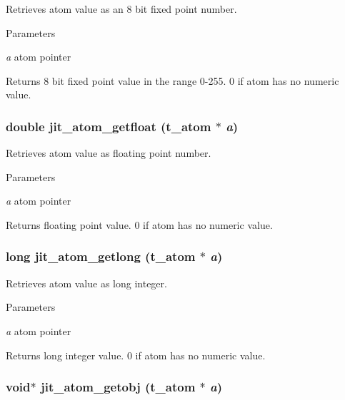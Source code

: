 Retrieves atom value as an 8 bit fixed point number. 
\begin{DoxyParams}{Parameters}
\item[{\em a}]atom pointer\end{DoxyParams}
\begin{DoxyReturn}{Returns}
8 bit fixed point value in the range 0-\/255. 0 if atom has no numeric value. 
\end{DoxyReturn}
\hypertarget{group__atommod_gae5882d0bf97c939882126ba235eee409}{
\subsubsection[{jit\_\-atom\_\-getfloat}]{\setlength{\rightskip}{0pt plus 5cm}double jit\_\-atom\_\-getfloat ({\bf t\_\-atom} $\ast$ {\em a})}}
\label{group__atommod_gae5882d0bf97c939882126ba235eee409}


Retrieves atom value as floating point number. 
\begin{DoxyParams}{Parameters}
\item[{\em a}]atom pointer\end{DoxyParams}
\begin{DoxyReturn}{Returns}
floating point value. 0 if atom has no numeric value. 
\end{DoxyReturn}
\hypertarget{group__atommod_gaf63b5b3ffc46134bed05adf071a7d52a}{
\subsubsection[{jit\_\-atom\_\-getlong}]{\setlength{\rightskip}{0pt plus 5cm}long jit\_\-atom\_\-getlong ({\bf t\_\-atom} $\ast$ {\em a})}}
\label{group__atommod_gaf63b5b3ffc46134bed05adf071a7d52a}


Retrieves atom value as long integer. 
\begin{DoxyParams}{Parameters}
\item[{\em a}]atom pointer\end{DoxyParams}
\begin{DoxyReturn}{Returns}
long integer value. 0 if atom has no numeric value. 
\end{DoxyReturn}
\hypertarget{group__atommod_ga84dda6fa7e1e2f29e897c1d87a06ba8e}{
\subsubsection[{jit\_\-atom\_\-getobj}]{\setlength{\rightskip}{0pt plus 5cm}void$\ast$ jit\_\-atom\_\-getobj ({\bf t\_\-atom} $\ast$ {\em a})}}
\label{group__atommod_ga84dda6fa7e1e2f29e897c1d87a06ba8e}


